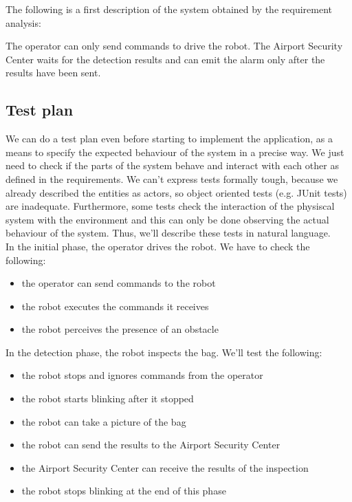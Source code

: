 \documentclass{llncs}
\begin{document}
The following is a first description of the system obtained by the requirement analysis:

The operator can only send commands to drive the robot.
The Airport Security Center waits for the detection results and can emit the alarm only after the results have been sent.

\subsection{Test plan}
We can do a test plan even before starting to implement the application, as a means to specify the expected behaviour of the system in a precise way. We just need to check if the parts of the system behave and interact with each other as defined in the requirements.
We can't express tests formally tough, because we already described the entities as actors, so object oriented tests (e.g. JUnit tests) are inadequate. Furthermore, some tests check the interaction of the physiscal system with the environment and this can only be done observing the actual behaviour of the system. Thus, we'll describe these tests in natural language.\\
In the initial phase, the operator drives the robot. We have to check the following:
\begin{itemize}
\item the operator can send commands to the robot
\item the robot executes the commands it receives
\item the robot perceives the presence of an obstacle
\end{itemize}
In the detection phase, the robot inspects the bag. We'll test the following:
\begin{itemize}
\item the robot stops and ignores commands from the operator
\item the robot starts blinking after it stopped
\item the robot can take a picture of the bag
\item the robot can send the results to the Airport Security Center
\item the Airport Security Center can receive the results of the inspection
\item the robot stops blinking at the end of this phase
\end{itemize}
\end{document}
